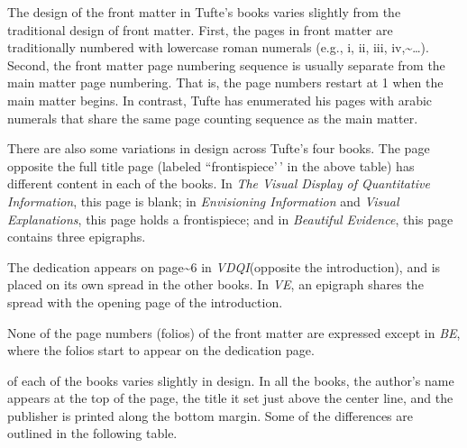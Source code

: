 \documentclass{tufte-book}
\newcommand{\vdqi}{\textit{VDQI}\xspace}
\newcommand{\ve}{\textit{VE}\xspace}
\newcommand{\be}{\textit{BE}\xspace}
\newcommand{\VDQI}{\textit{The Visual Display of Quantitative Information}\xspace}
\newcommand{\EI}{\textit{Envisioning Information}\xspace}
\newcommand{\VE}{\textit{Visual Explanations}\xspace}
\newcommand{\BE}{\textit{Beautiful Evidence}\xspace}
\begin{document}
\bigskip

The design of the front matter in Tufte's books varies slightly from the
traditional design of front matter. First, the pages in front matter are
traditionally numbered with lowercase roman numerals (e.g., i, ii, iii,
iv,\textasciitilde{}\ldots). Second, the front matter page numbering
sequence is usually separate from the main matter page numbering. That
is, the page numbers restart at 1 when the main matter begins. In
contrast, Tufte has enumerated his pages with arabic numerals that share
the same page counting sequence as the main matter.

There are also some variations in design across Tufte's four books. The
page opposite the full title page (labeled ``frontispiece'\,' in the
above table) has different content in each of the books. In \VDQI, this
page is blank; in \EI and \VE, this page holds a frontispiece; and in
\BE, this page contains three epigraphs.

The dedication appears on page\textasciitilde6 in \vdqi (opposite the
introduction), and is placed on its own spread in the other books. In
\ve, an epigraph shares the spread with the opening page of the
introduction.

None of the page numbers (folios) of the front matter are expressed
except in \be, where the folios start to appear on the dedication page.

 of each of the books varies slightly in
design. In all the books, the author's name appears at the top of the
page, the title it set just above the center line, and the publisher is
printed along the bottom margin. Some of the differences are outlined in
the following table.
\end{document}
